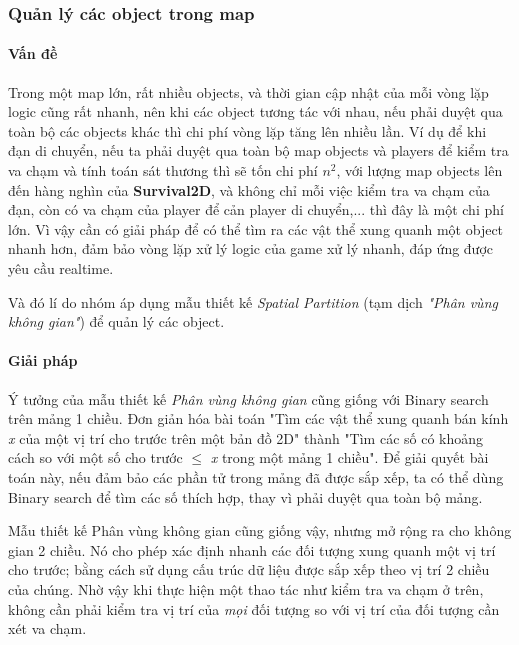 \documentclass[12pt,a4paper]{article}
\begin{document}
  \subsubsection{Quản lý các object trong map}

  \paragraph{Vấn đề}\mbox{}
  
  Trong một map lớn, rất nhiều objects, và thời gian cập nhật của mỗi vòng lặp logic cũng rất nhanh, nên khi các object tương tác với nhau, nếu phải duyệt qua toàn bộ các objects khác thì chi phí vòng lặp tăng lên nhiều lần. Ví dụ để khi đạn di chuyển, nếu ta phải duyệt qua toàn bộ map objects và players để kiểm tra va chạm và tính toán sát thương thì sẽ tốn chi phí $n^2$, với lượng map objects lên đến hàng nghìn của \textbf{Survival2D}, và không chỉ mỗi việc kiểm tra va chạm của đạn, còn có va chạm của player để cản player di chuyển,... thì đây là một chi phí lớn. Vì vậy cần có giải pháp để có thể tìm ra các vật thể xung quanh một object nhanh hơn, đảm bảo vòng lặp xử lý logic của game xử lý nhanh, đáp ứng được yêu cầu realtime.
  
  Và đó lí do nhóm áp dụng mẫu thiết kế \textit{Spatial Partition} (tạm dịch \textit{"Phân vùng không gian"}) để quản lý các object.

  \paragraph{Giải pháp}\mbox{}

   Ý tưởng của mẫu thiết kế \textit{Phân vùng không gian} cũng giống với Binary search trên mảng 1 chiều. Đơn giản hóa bài toán "Tìm các vật thể xung quanh bán kính \textit{x} của một vị trí cho trước trên một bản đồ 2D" thành "Tìm các số có khoảng cách so với một số cho trước $\le$ \textit{x} trong một mảng 1 chiều". Để giải quyết bài toán này, nếu đảm bảo các phần tử trong mảng đã được sắp xếp, ta có thể dùng Binary search để tìm các số thích hợp, thay vì phải duyệt qua toàn bộ mảng.

   Mẫu thiết kế Phân vùng không gian cũng giống vậy, nhưng mở rộng ra cho không gian 2 chiều. Nó cho phép xác định nhanh các đối tượng xung quanh một vị trí cho trước; bằng cách sử dụng cấu trúc dữ liệu được sắp xếp theo vị trí 2 chiều của chúng. Nhờ vậy khi thực hiện một thao tác như kiểm tra va chạm ở trên, không cần phải kiểm tra vị trí của \textit{mọi} đối tượng so với vị trí của đối tượng cần xét va chạm.
   
\end{document}
